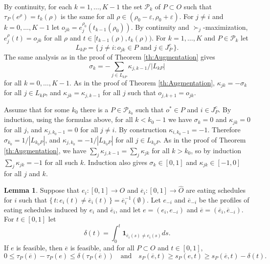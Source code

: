 \documentclass[12pt]{article}
\theoremstyle{definition}
\newtheorem{lem}{Lemma}
\newcommand{\bare}{\overline{e}}
\newcommand{\cP}{\mathcal{P}}
\newcommand{\hO}{{\hat O}}
\newcommand{\varep}{\varepsilon}
\newcommand{\bone}{\mathbf{1}}
\begin{document}
\begin{appendix}
By continuity, for each $k = 1, \ldots, K-1$ the set $\cP_k$ of $P \subset O$ such that $\tau_P(e^\rho) = t_k(\rho)$ is the same for all $\rho \in (\rho_0 - \varep,\rho_0 + \varep)$.  For $j \ne i$ and $k = 0, \ldots, K-1$ let $o_{jk} = e^{\rho_0}_j(t_{k-1}(\rho_0))$.  By continuity and $\succ_j$-maximization, $e^{\rho}_j(t) = o_{jk}$ for all $\rho$ and $t \in [t_{k-1}(\rho),t_k(\rho))$.  For $k = 1, \ldots, K$ and $P \in \cP_k$ let $$L_{kP} = \{\, j \ne i : \text{$o_{jk} \in P$ and $j \in J_P^c$} \,\}.$$  The same analysis as in the proof of Theorem \ref{th:Augmentation} gives 
  $$\sigma_k = - \sum_{j \in L_{kP}} \kappa_{j,k-1}/|L_{kP}|$$ for  all $k = 0, \ldots, K-1$.    As in the proof of Theorem \ref{th:Augmentation}, $\kappa_{jk} = -\sigma_k$ for all $j \in L_{kP}$, and $\kappa_{jk} = \kappa_{j,k-1}$ for all $j$ such that $o_{j,k+1} = o_{jk}$.

Assume that for some $k_0$ there is a $P \in \cP_{k_0}$ such that $o^* \in P$ and $i \in J_P^c$.  By induction, using the formulas above, for all $k < k_0-1$ we have $\sigma_k = 0$ and $\kappa_{jk} = 0$ for all $j$, and $\kappa_{j,k_0-1} = 0$ for all $j \ne i$.  By construction $\kappa_{i,k_0-1} = -1$.  Therefore $\sigma_{k_0} = 1/|L_{k_0P}|$, and $\kappa_{j,k_0} = -1/|L_{k_0P}|$ for all $j \in L_{k_0P}$.  As in the proof of Theorem \ref{th:Augmentation}, we have $\sum_j \kappa_{j,k-1} = \sum_j \kappa_{jk}$ for all $k > k_0$, so by induction $\sum_j \kappa_{jk} = -1$ for all such $k$.  Induction also gives  $\sigma_k \in [0,1]$ and $\kappa_{jk} \in [-1,0]$ for all $j$ and $k$.

  
\begin{lem} \label{lemma:FeasibleNew}
  Suppose that $e_i \colon [0,1] \to O$ and $\bare_i \colon [0,1] \to \hO$ are eating schedules for $i$ such that $\{\, t : e_i(t) \ne \bare_i(t) \,\} = \bare_i^{-1}(\emptyset)$.  Let $e_{-i}$ and $\bare_{-i}$ be the profiles of eating schedules induced by $e_i$ and $\bare_i$, and let $e = (e_i,e_{-i})$ and $\bare = (\bare_i,\bare_{-i})$.  For $t \in [0,1]$ let
  $$\delta(t) = \int_0^t \bone_{\bare_i(s) \ne e_i(s)} ds.$$
  If $e$ is feasible, then $\bare$ is feasible, and for all $P \subset O$ and $t \in [0,1]$, 
  $$0 \le \tau_P(\bare) - \tau_P(e) \le \delta(\tau_P(\bare)) \quad \text{and} \quad s_P(\bare,t) \ge s_P(e,t) \ge s_P(\bare,t) - \delta(t).$$
\end{lem}


\end{appendix}
\end{document}
